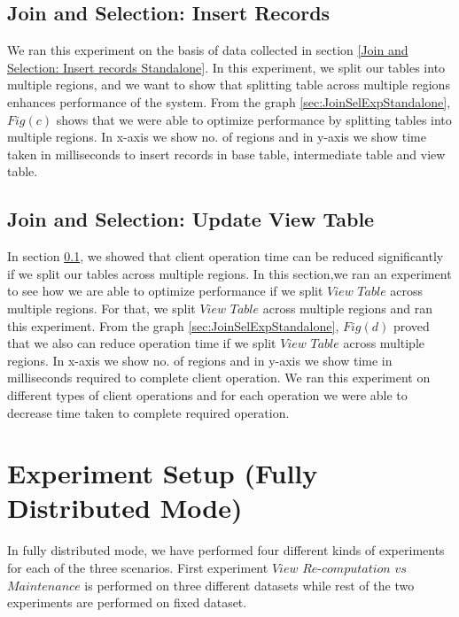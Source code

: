 \documentclass[11pt,a4paper,bibtotoc,idxtotoc,headsepline,footsepline,footexclude,BCOR12mm,DIV13]{scrbook}
\begin{document}
\subsection{Join and Selection: Insert Records}
\label{Join and Selection: Insert Records Standalone}
We ran this experiment on the basis of data collected in section \ref{Join and Selection: Insert records Standalone}. In this experiment, we split our tables into multiple regions, and we want to show that splitting table across multiple regions enhances performance of the system. From the graph \ref{sec:JoinSelExpStandalone}, $Fig(c)$ shows that we were able to optimize performance by splitting tables into multiple regions. In x-axis we show no. of regions and in y-axis we show time taken in milliseconds to insert records in base table, intermediate table and view table.

\subsection{Join and Selection: Update View Table} 
\label{Join and Sel: Update View Table Standalone}
In section \ref{Join and Selection: Insert Records Standalone}, we showed that client operation time can be reduced significantly if we split our tables across multiple regions. In this section,we ran an experiment to see how we are able to optimize performance if we split $View$ $Table$ across multiple regions. For that, we split $View$ $Table$ across multiple regions and ran this experiment. From the graph \ref{sec:JoinSelExpStandalone}, $Fig(d)$ proved that we also can reduce operation time if we split $View$ $Table$ across multiple regions. In x-axis we show no. of regions and in y-axis we show time in milliseconds required to complete client operation. We ran this experiment on different types of client operations and for each operation we were able to decrease time taken to complete required operation. 

\section{Experiment Setup (Fully Distributed Mode)}
In fully distributed mode, we have performed four different kinds of experiments for each of the three scenarios. First experiment $View$ $Re$-$computation$ $vs$ $Maintenance$ is performed on three different datasets while rest of the two experiments are performed on fixed dataset.
\end{document}
